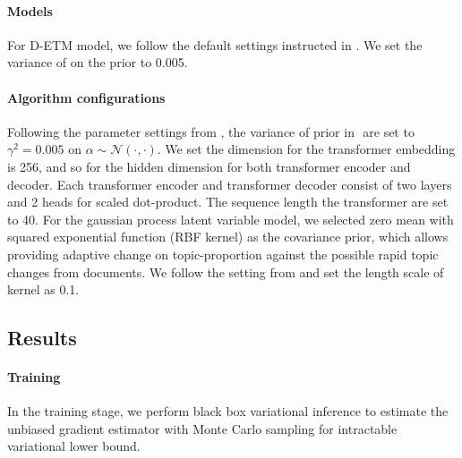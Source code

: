 \paragraph{Models}
For D-ETM model, we follow the default settings instructed in \cite{dieng_dynamic_2019}. We set the variance of  on the prior to 0.005.
\paragraph{Algorithm configurations}
Following the parameter settings from \cite{blei_dynamic_2006}, the variance of prior in $  $ are set to $ \gamma^2=0.005 $ on $ \alpha\sim\mathcal{N}(\cdot,\cdot) $.
We set the dimension for the transformer embedding is 256, and so for the hidden dimension for both transformer encoder and decoder. Each transformer encoder and transformer decoder consist of two layers and 2 heads for scaled dot-product. The sequence length the transformer are set to 40.
For the gaussian process latent variable model, we selected zero mean with squared exponential function (RBF kernel) as the covariance prior, which allows providing adaptive change on topic-proportion against the possible rapid topic changes from documents. We follow the setting from \cite{tomasi_stochastic_nodate} and set the length scale of kernel as 0.1.
\subsection{Results}
\paragraph{Training}
In the training stage, we perform black box variational inference to estimate the unbiased gradient estimator with Monte Carlo sampling for intractable variational lower bound.
